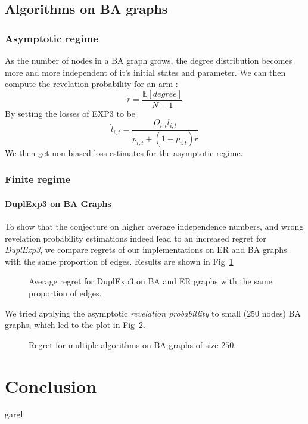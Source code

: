 \documentclass[10pt,a4paper]{scrartcl}
\providecommand{\E}{\mathbb{E}}
\begin{document}
\subsection{Algorithms on BA graphs}
\subsubsection{Asymptotic regime}
As the number of nodes in a BA graph grows, the degree distribution becomes more and more independent of it's initial states and parameter. We can then compute the revelation probability for an arm :
$$r = \frac{\E[degree]}{N-1}$$
By setting the losses of EXP3 to be 
$$\hat{l}_{i,t} = \frac{O_{i,t}l_{i,t}}{p_{i,t}+(1-p_{i,t})r}$$
We then get non-biased loss estimates for the asymptotic regime.


\subsubsection{Finite regime}
\paragraph{DuplExp3 on BA Graphs}
To show that the conjecture on higher average independence numbers, and wrong revelation probability estimations indeed lead to an increased regret for \emph{DuplExp3}, we compare regrets of our implementations on ER and BA graphs with the same proportion of edges. Results are shown in Fig~\ref{dupl_er_ba}

\begin{figure}
 \label{dupl_er_ba}
 \caption{Average regret for DuplExp3 on BA and ER graphs with the same proportion of edges.}
\end{figure}

We tried applying the asymptotic \emph{revelation probabillity} to small ($250$ nodes) BA graphs, which led to the plot in Fig~\ref{dupl_ba_finite_ba}.

\begin{figure}
 \label{dupl_ba_finite_ba}
 \caption{Regret for multiple algorithms on BA graphs of size $250$.}
\end{figure}


\section{Conclusion}
gargl
\end{document}
